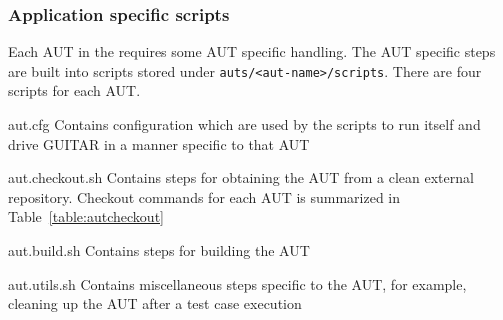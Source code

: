 %
%
\subsubsection{Application specific scripts}

Each AUT in the \mddozen{} requires some AUT specific handling. The AUT specific steps are built into scripts stored under \texttt{auts/<aut-name>/scripts}. There are four scripts for each AUT.\\

\begin{smalldescription}
 \item [aut.cfg] Contains configuration which are used by the \mddozen{} scripts to run itself and drive GUITAR in a manner specific to that AUT
 \item [aut.checkout.sh] Contains steps for obtaining the AUT from a clean external repository. Checkout commands for each AUT is summarized in Table~\ref{table:autcheckout}
 \item [aut.build.sh] Contains steps for building the AUT
 \item [aut.utils.sh] Contains miscellaneous steps specific to the AUT, for example, cleaning up the AUT after a test case execution
\end{smalldescription}

